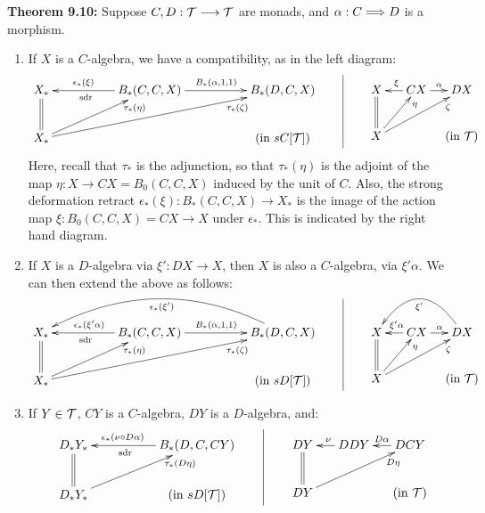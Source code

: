 \documentclass[11pt]{article}
\begin{document}
\begin{chapter7-9}
\begin{itemise}
\noindent \textbf{\Bullet Theorem 9.10:} 
Suppose $C,D:\mathcal{T}\longrightarrow\mathcal{T}$ are monads, and  $\alpha:C\Longrightarrow D$ is a morphism.
\begin{enumerate}\squishlist
\item If $X$ is a $C$-algebra, we have a compatibility, as in the left diagram:
\[\xymatrix@C=1.8cm{
\ar@{=}[d]X_*&\ar[l]_{\epsilon_*(\xi)\qquad}^{\textup{sdr\qquad}}
B_*(C,C,X)\ar[r]^{B_*(\alpha,1,1)}
&B_*(D,C,X)\\
X_*\ar[ur]_(.8){\tau_*(\eta)}\ar[urr]_(.8){\tau_*(\zeta)}&
&\makebox[0cm][c]{(in $sC[\calT]$)}
}\qquad\vrule\qquad\xymatrix@C=.5cm{
X\ar@{=}[d]&\ar[l]_{\xi}CX\ar[r]^\alpha&DX\\
X\ar[ur]_(.8){\eta}\ar[urr]_(.8){\zeta}&&\makebox[0cm][c]{(in $\calT$)}
}\]
Here, recall that $\tau_*$ is the adjunction, so that $\tau_*(\eta)$ is the adjoint of the map $\eta:X\to CX=B_0(C,C,X)$ induced by the unit of $C$. Also, the strong deformation retract $\epsilon_*(\xi):B_*(C,C,X)\to X_*$ is the image of the action map $\xi:B_0(C,C,X)=CX\to X$ under $\epsilon_*$. This is indicated by the right hand diagram.
\item If $X$ is a $D$-algebra via $\xi':DX\to X$, then $X$ is also a $C$-algebra, via $\xi'\alpha$. We can then extend the above as follows:
\[\xymatrix@C=1.8cm{
\ar@{=}[d]X_*&\ar[l]_{\epsilon_*(\xi'\alpha)\quad}^{\textup{sdr\qquad}}
B_*(C,C,X)\ar[r]^{B_*(\alpha,1,1)}
&B_*(D,C,X)\ar@/_1cm/[ll]^{\epsilon_*(\xi')}\\
X_*\ar[ur]_(.8){\tau_*(\eta)}\ar[urr]_(.8){\tau_*(\zeta)}&&\makebox[0cm][c]{(in $sD[\calT]$)}
}\qquad\vrule\qquad\xymatrix@C=.5cm{
X\ar@{=}[d]&\ar[l]_{\xi'\alpha}CX\ar[r]^\alpha&DX\ar@/_1cm/[ll]^{\xi'}\\
X\ar[ur]_(.8){\eta}\ar[urr]_(.8){\zeta}&&\makebox[0cm][c]{(in $\calT$)}
}\]
\item If $Y\in\mathcal{T}$, $CY$ is a $C$-algebra, $DY$ is a $D$-algebra, and:
\[\xymatrix@C=1.8cm{
\ar@{=}[d]D_*Y_*&\ar[l]_{\epsilon_*(\nu\circ D\alpha)\qquad}^{\textup{sdr\qquad}}
B_*(D,C,CY)\\
D_*Y_*\ar[ur]_(.8){\tau_*(D\eta)}
&\makebox[0cm][c]{(in $sD[\calT]$)}
}\qquad\vrule\qquad\xymatrix@C=.5cm{
DY\ar@{=}[d]&\ar[l]_{\nu}DDY&\ar[l]_{D\alpha}DCY\\
DY\ar[urr]_(.8){D\eta}&&\makebox[0cm][c]{(in $\calT$)}
}\]
\end{enumerate}


\end{itemise}
\end{chapter7-9}
\end{document}
